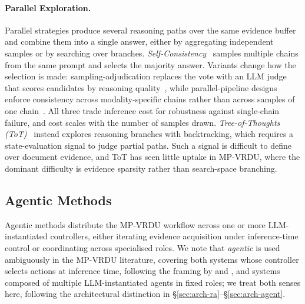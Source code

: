 \documentclass[11pt]{article}
\begin{document}
\paragraph{Parallel Exploration.}
Parallel strategies produce several reasoning paths over the same evidence buffer and combine them into a single answer, either by aggregating independent samples or by searching over branches. \emph{Self-Consistency}~\cite{wang2022self} samples multiple chains from the same prompt and selects the majority answer. Variants change how the selection is made: sampling-adjudication replaces the vote with an LLM judge that scores candidates by reasoning quality~\cite{zhu2026doclens}, while parallel-pipeline designs enforce consistency across modality-specific chains rather than across samples of one chain~\cite{suri2025visdom}. All three trade inference cost for robustness against single-chain failure, and cost scales with the number of samples drawn. \emph{Tree-of-Thoughts (ToT)}~\cite{yao2023tree} instead explores reasoning branches with backtracking, which requires a state-evaluation signal to judge partial paths. Such a signal is difficult to define over document evidence, and ToT has seen little uptake in MP-VRDU, where the dominant difficulty is evidence sparsity rather than search-space branching.

\subsection{Agentic Methods}
\label{sec:agentic-methods}
Agentic methods distribute the MP-VRDU workflow across one or more LLM-instantiated controllers, either iterating evidence acquisition under inference-time control or coordinating across specialised roles. We note that \textit{agentic} is used ambiguously in the MP-VRDU literature, covering both systems whose controller selects actions at inference time, following the framing by \citeauthor{plaat2025agentic} and \citeauthor{wang2024survey}, and systems composed of multiple LLM-instantiated agents in fixed roles; we treat both senses here, following the architectural distinction in \S\ref{sec:arch-ra}–\S\ref{sec:arch-agent}.
\end{document}
